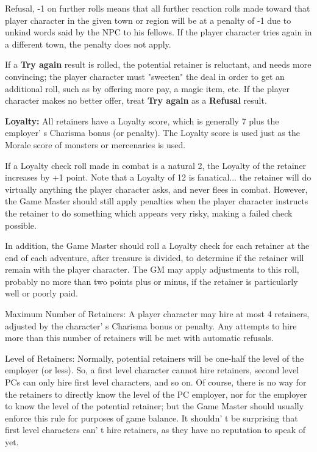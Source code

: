 \documentclass[a4paper,twoside,openany,10pt]{book}
\begin{document}
\begin{multicols}{2}
Refusal, -1 on further rolls means that all further reaction rolls made toward that player character in the given town or region will be at a penalty of -1 due to unkind words said by the NPC to his fellows. If the player character tries again in a different town, the penalty does not apply.

If a \textbf{Try again} result is rolled, the potential retainer is reluctant, and needs more convincing; the player character must "sweeten" the deal in order to get an additional roll, such as by offering more pay, a magic item, etc. If the player character makes no better offer, treat \textbf{Try again} as a \textbf{Refusal} result.

\textbf{Loyalty:} All retainers have a Loyalty score, which is generally 7 plus the employer' s Charisma bonus (or penalty). The Loyalty score is used just as the Morale score of monsters or mercenaries is used.

If a Loyalty check roll made in combat is a natural 2, the Loyalty of the retainer increases by +1 point. Note that a Loyalty of 12 is fanatical... the retainer will do virtually anything the player character asks, and never flees in combat. However, the Game Master should still apply penalties when the player character instructs the retainer to do something which appears very risky, making a failed check possible.

In addition, the Game Master should roll a Loyalty check for each retainer at the end of each adventure, after\textbf{ }treasure is divided, to determine if the retainer will remain with the player character. The GM may apply adjustments to this roll, probably no more than two points plus or minus, if the retainer is particularly well or poorly paid.

Maximum Number of Retainers: A player character may hire at most 4 retainers, adjusted by the character' s Charisma bonus or penalty. Any attempts to hire more than this number of retainers will be met with automatic refusals.

Level of Retainers: Normally, potential retainers will be one-half the level of the employer (or less). So, a first level character cannot hire retainers, second level PCs can only hire first level characters, and so on. Of course, there is no way for the retainers to directly know the level of the PC employer, nor for the employer to know the level of the potential retainer; but the Game Master should usually enforce this rule for purposes of game balance. It shouldn' t be surprising that first level characters can' t hire retainers, as they have no reputation to speak of yet.


\end{multicols}
\end{document}
